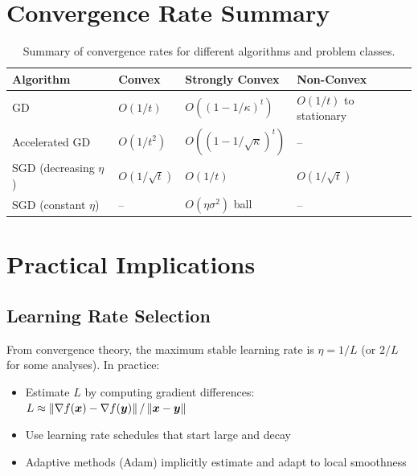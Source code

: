 \documentclass[../../main.tex]{subfiles}
\begin{document}
\section{Convergence Rate Summary}
\label{sec:rate-summary}

\begin{table}[htbp]
\centering
\caption{Summary of convergence rates for different algorithms and problem classes.}
\label{tab:convergence-summary}
\begin{tabular}{@{}llll@{}}
\toprule
\textbf{Algorithm} & \textbf{Convex} & \textbf{Strongly Convex} & \textbf{Non-Convex} \\
\midrule
GD & $O(1/t)$ & $O((1-1/\kappa)^t)$ & $O(1/t)$ to stationary \\
Accelerated GD & $O(1/t^2)$ & $O((1-1/\sqrt{\kappa})^t)$ & -- \\
SGD (decreasing $\eta$) & $O(1/\sqrt{t})$ & $O(1/t)$ & $O(1/\sqrt{t})$ \\
SGD (constant $\eta$) & -- & $O(\eta\sigma^2)$ ball & -- \\
\bottomrule
\end{tabular}
\end{table}

\section{Practical Implications}
\label{sec:practical-implications}

\subsection{Learning Rate Selection}

\begin{principle}
From convergence theory, the maximum stable learning rate is $\eta = 1/L$ (or $2/L$ for some analyses). In practice:
\begin{itemize}
    \item Estimate $L$ by computing gradient differences: $L \approx \left\lVert \nabla f(\boldsymbol{x}) - \nabla f(\boldsymbol{y}) \right\rVert/\left\lVert \boldsymbol{x} - \boldsymbol{y} \right\rVert$
    \item Use learning rate schedules that start large and decay
    \item Adaptive methods (Adam) implicitly estimate and adapt to local smoothness
\end{itemize}
\end{principle}
\end{document}
